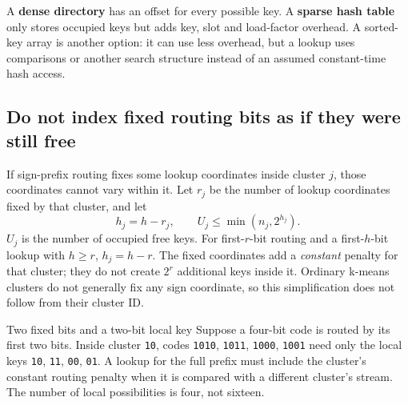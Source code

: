 A \textbf{dense directory} has an offset for every possible key. A \textbf{sparse hash table}
only stores occupied keys but adds key, slot and load-factor overhead. A sorted-key array is
another option: it can use less overhead, but a lookup uses comparisons or another search
structure instead of an assumed constant-time hash access.

\subsection{Do not index fixed routing bits as if they were still free}
If sign-prefix routing fixes some lookup coordinates inside cluster $j$, those coordinates
cannot vary within it. Let $r_j$ be the number of lookup coordinates fixed by that cluster,
and let
\begin{equation}
h_j=h-r_j,\qquad U_j\leq\min(n_j,2^{h_j}).
\label{eq:free-key}
\end{equation}
$U_j$ is the number of occupied free keys. For first-$r$-bit routing and a first-$h$-bit lookup
with $h\geq r$, $h_j=h-r$. The fixed coordinates add a \emph{constant} penalty for that cluster;
they do not create $2^r$ additional keys inside it. Ordinary k-means clusters do not generally
fix any sign coordinate, so this simplification does not follow from their cluster ID.

\begin{examplebox}{Two fixed bits and a two-bit local key}
Suppose a four-bit code is routed by its first two bits. Inside cluster \texttt{10}, codes
\texttt{1010}, \texttt{1011}, \texttt{1000}, \texttt{1001} need only the local keys
\texttt{10}, \texttt{11}, \texttt{00}, \texttt{01}. A lookup for the full prefix must include
the cluster's constant routing penalty when it is compared with a different cluster's stream.
The number of local possibilities is four, not sixteen.
\end{examplebox}

